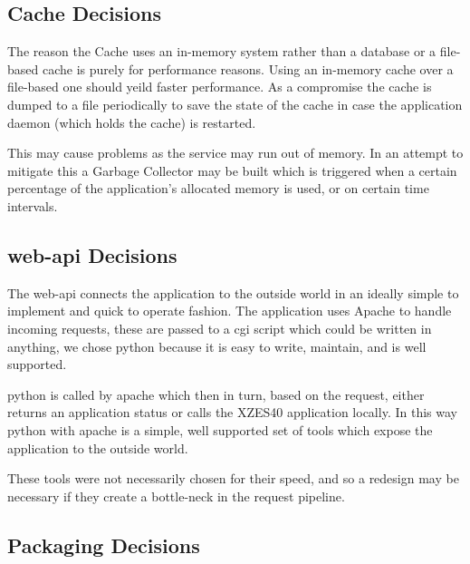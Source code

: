 \subsection{Cache Decisions}

The reason the Cache uses an in-memory system rather than a database or a file-based cache is purely for performance reasons.
Using an in-memory cache over a file-based one should yeild faster performance.
As a compromise the cache is dumped to a file periodically to save the state of the cache in case the application daemon (which holds the cache) is restarted.

This may cause problems as the service may run out of memory.
In an attempt to mitigate this a Garbage Collector may be built which is triggered when a certain percentage of the application's allocated memory is used, or on certain time intervals.
 
\subsection{\gls{web-api} Decisions}

The \gls{web-api} connects the application to the outside world in an ideally simple to implement and quick to operate fashion.
The application uses Apache to handle incoming requests, these are passed to a \gls{cgi} script which could be written in anything, we chose \gls{python} because it is easy to write, maintain, and is well supported.

\gls{python} is called by \gls{apache} which then in turn, based on the request, either returns an application status or calls the XZES40 application locally.
In this way \gls{python} with \gls{apache} is a simple, well supported set of tools which expose the application to the outside world.

These tools were not necessarily chosen for their speed, and so a redesign may be necessary if they create a bottle-neck in the request pipeline.

\subsection{Packaging Decisions}

